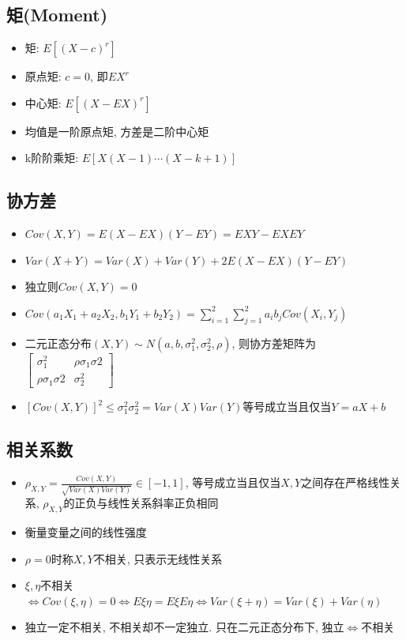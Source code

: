 \documentclass[UTF8]{article}
\begin{document}
\subsection{矩(Moment)}
\begin{itemize}
\item 矩: $E[(X-c)^r]$
\item 原点矩: $c=0$, 即$EX^r$
\item 中心矩: $E[(X-EX)^r]$
\item 均值是一阶原点矩, 方差是二阶中心矩
\item k阶阶乘矩: $E[X(X-1)\cdots(X-k+1)]$
\end{itemize}
\subsection{协方差}
\begin{itemize}
\item $Cov(X,Y)=E(X-EX)(Y-EY)=EXY-EXEY	$
\item $Var(X+Y)=Var(X)+Var(Y)+2E(X-EX)(Y-EY)$
\item 独立则$Cov(X,Y)=0$
\item $Cov(a_1X_1+a_2X_2, b_1Y_1+b_2Y_2)=\sum\limits_{i=1}^{2}\sum\limits_{j=1}^{2}a_ib_jCov(X_i,Y_j)$
\item 二元正态分布$(X,Y)\sim N(a,b,\sigma_1^2, \sigma_2^2,\rho)$, 则协方差矩阵为$\left[\begin{array}{cc}\sigma_1^2 & \rho\sigma_1\sigma2\\\rho\sigma_1\sigma2 & \sigma_2^2\end{array}\right]$
\item $[Cov(X,Y)]^2\le\sigma_1^2\sigma_2^2=Var(X)Var(Y)$等号成立当且仅当$Y=aX+b$
\end{itemize}
\subsection{相关系数}
\begin{itemize}
\item $\rho_{X,Y}=\frac{Cov(X,Y)}{\sqrt{Var(X)Var(Y)}}\in[-1,1]$, 等号成立当且仅当$X,Y$之间存在严格线性关系, $\rho_{X,Y}$的正负与线性关系斜率正负相同
\item 衡量变量之间的线性强度
\item $\rho=0$时称$X,Y$不相关, 只表示无线性关系
\item $\xi,\eta$不相关$\Leftrightarrow Cov(\xi, \eta)=0 \Leftrightarrow E\xi\eta=E\xi E\eta \Leftrightarrow Var(\xi+\eta)=Var(\xi)+Var(\eta)$
\item 独立一定不相关, 不相关却不一定独立. 只在二元正态分布下, 独立$\Leftrightarrow$不相关
\end{itemize}
\end{document}
